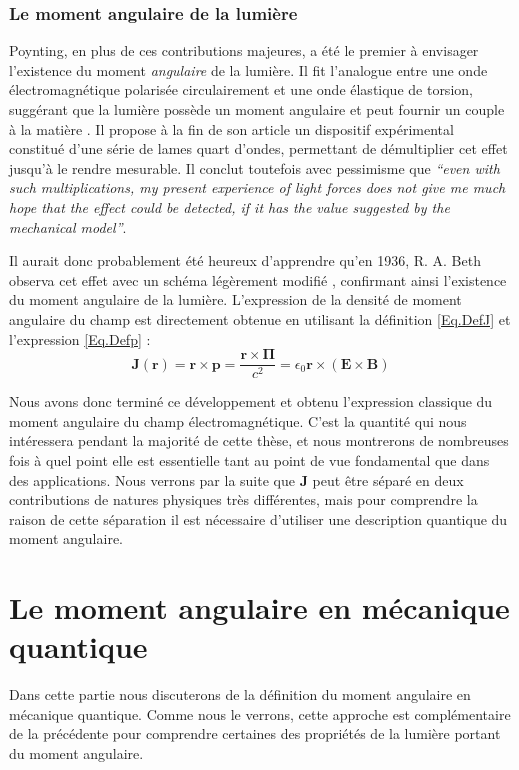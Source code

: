 \subsubsection{Le moment angulaire de la lumière}
Poynting, en plus de ces contributions majeures, a été le premier à envisager l'existence du moment \textit{angulaire} de la lumière. Il fit l'analogue entre une onde électromagnétique polarisée circulairement et une onde élastique de torsion, suggérant que la lumière possède un moment angulaire et peut fournir un couple à la matière . Il propose à la fin de son article un dispositif expérimental constitué d'une série de lames quart d'ondes, permettant de démultiplier cet effet jusqu'à le rendre mesurable. Il conclut toutefois avec pessimisme que \textit{``even with such multiplications, my present experience of light forces does not give me much hope that the effect could be detected, if it has the value suggested by the mechanical model''}.

Il aurait donc probablement été heureux d'apprendre qu'en 1936, R. A. Beth observa cet effet avec un schéma légèrement modifié , confirmant ainsi l'existence du moment angulaire de la lumière.
L'expression de la densité de moment angulaire du champ est directement obtenue en utilisant la définition \ref{Eq.DefJ} et l'expression \ref{Eq.Defp} :
\begin{equation}
\bm{J}(\bm{r})=\bm{r}\times\bm{p}=\frac{\bm{r}\times\bm{\Pi}}{c^2} = \epsilon_0\bm{r}\times(\bm{E}\times\bm{B})
\label{Eq.DefJEM}
\end{equation}

Nous avons donc terminé ce développement et obtenu l'expression classique du moment angulaire du champ électromagnétique. C'est la quantité qui nous intéressera pendant la majorité de cette thèse, et nous montrerons de nombreuses fois à quel point elle est essentielle tant au point de vue fondamental que dans des applications. Nous verrons par la suite que $\bm{J}$ peut être séparé en deux contributions de natures physiques très différentes, mais pour comprendre la raison de cette séparation il est nécessaire d'utiliser une description quantique du moment angulaire. 

\section{Le moment angulaire en mécanique quantique}
Dans cette partie nous discuterons de la définition du moment angulaire en mécanique quantique. Comme nous le verrons, cette approche est complémentaire de la précédente pour comprendre certaines des propriétés de la lumière portant du moment angulaire. 

